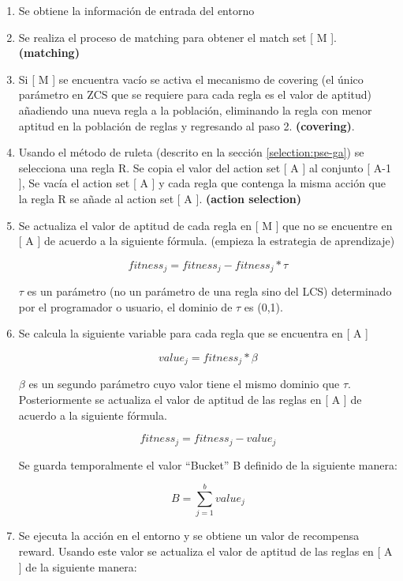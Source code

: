 \documentclass[11pt,fleqn]{book} %
\begin{document}
\begin{enumerate}
\item Se obtiene la información de entrada del entorno 
\item Se realiza el proceso de matching para obtener el match set [ M ]. \textbf{(matching)} 
\item Si [ M ] se encuentra vacío se activa el mecanismo de covering (el único parámetro en ZCS que se requiere para cada regla es el valor de aptitud) añadiendo una nueva regla a la población, eliminando la regla con menor aptitud en la población de reglas y regresando al paso 2. \textbf{(covering)}.
\item Usando el método de ruleta (descrito en la sección \ref{selection:pse-ga}) se selecciona una regla R. Se copia el valor del action set [ A ] al conjunto [ A-1 ], Se vacía el action set [ A ] y cada regla que contenga la misma acción que la regla R se añade al action set [ A ]. 
\textbf{(action selection)}
\item Se actualiza el valor de aptitud de cada regla en [ M ] que no se encuentre en [ A ] de acuerdo a la siguiente fórmula. (empieza la estrategia de aprendizaje)

\begin{equation}
fitness_j=fitness_j-fitness_j*\tau
\end{equation}

$\tau$ es un parámetro (no un parámetro de una regla sino del LCS) determinado por el programador o usuario, el dominio de $\tau$ es (0,1).

\item Se calcula la siguiente variable para cada regla que se encuentra en [ A ]

\begin{equation}
value_j = fitness_j * \beta
\end{equation}

$\beta$ es un segundo parámetro cuyo valor tiene el mismo dominio que $\tau$. Posteriormente se actualiza el valor de aptitud de las reglas en [ A ] de acuerdo a la siguiente fórmula.

\begin{equation}
fitness_j=fitness_j-value_j
\end{equation}

Se guarda temporalmente el valor “Bucket” B definido de la siguiente manera:

\begin{equation}
B = \sum_{j=1}^{b}value_j
\end{equation}
\item Se ejecuta la acción en el entorno y se obtiene un valor de recompensa reward. Usando este valor se actualiza el valor de aptitud de las reglas en [ A ] de la siguiente manera:


\end{enumerate}
\end{document}
